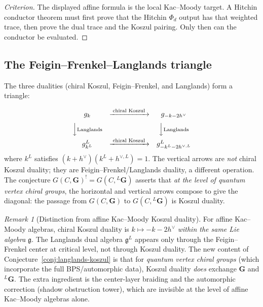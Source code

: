 \documentclass[11pt]{article}
\theoremstyle{definition}
\theoremstyle{remark}
\newtheorem{remark}[theorem]{Remark}
\newcommand{\fkg}{\mathfrak{g}}
\begin{document}
\begin{proof}[Criterion]
The displayed affine formula is the local Kac--Moody target. A Hitchin
conductor theorem must first prove that the Hitchin $\Phi_d$ output has
that weighted trace, then prove the dual trace and the Koszul pairing.
Only then can the conductor be evaluated.
\end{proof}

\subsection{The Feigin--Frenkel--Langlands triangle}

The three dualities (chiral Koszul, Feigin--Frenkel, and
Langlands) form a triangle:

\begin{equation}\label{eq:fff-triangle}
\begin{array}{ccc}
\widehat{\fkg}_k & \xrightarrow{\;\text{chiral Koszul}\;} &
\widehat{\fkg}_{-k-2h^\vee} \\[6pt]
\Big\downarrow{\scriptstyle\text{Langlands}} & &
\Big\downarrow{\scriptstyle\text{Langlands}} \\[6pt]
\widehat{\fkg^L}_{k^L} &
\xrightarrow{\;\text{chiral Koszul}\;} &
\widehat{\fkg^L}_{-k^L-2h^{\vee,L}}
\end{array}
\end{equation}
where $k^L$ satisfies $(k+h^\vee)(k^L + h^{\vee,L}) = 1$. The
vertical arrows are \emph{not} chiral Koszul duality; they are
Feigin--Frenkel/Langlands duality, a different operation. The
conjecture $G(C, \mathbf{G})^! = G(C, {}^L\mathbf{G})$ asserts that
\emph{at the level of quantum vertex chiral groups}, the horizontal
and vertical arrows compose to give the diagonal: the passage from
$G(C, \mathbf{G})$ to $G(C, {}^L\mathbf{G})$ is Koszul duality.

\begin{remark}[Distinction from affine Kac--Moody Koszul duality]
For affine Kac--Moody algebras, chiral Koszul duality is
$k \mapsto -k - 2h^\vee$ \emph{within the same Lie algebra} $\fkg$.
The Langlands dual algebra $\fkg^L$ appears only through the
Feigin--Frenkel center at critical level, not through Koszul duality.
The new content of Conjecture~\ref{conj:langlands-koszul} is that
for \emph{quantum vertex chiral groups} (which incorporate the full
BPS/automorphic data), Koszul duality \emph{does} exchange
$\mathbf{G}$ and ${}^L\mathbf{G}$. The extra ingredient is the
center-layer braiding and the automorphic correction (shadow
obstruction tower), which are invisible at the level of affine
Kac--Moody algebras alone.
\end{remark}
\end{document}
